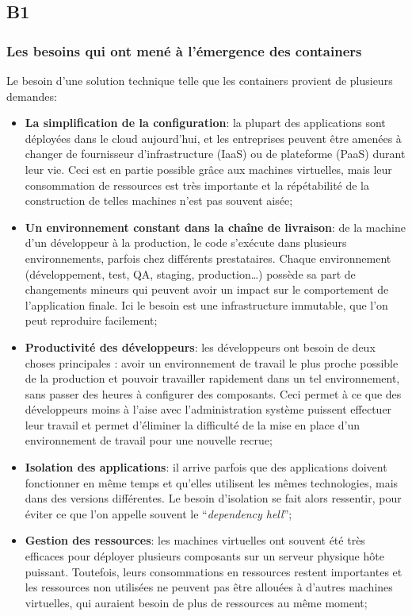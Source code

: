 \subsection*{B1}
    \subsubsection*{Les besoins qui ont mené à l'émergence des containers}
        Le besoin d'une solution technique telle que les containers provient de plusieurs demandes:
        \begin{itemize}
            \item \textbf{La simplification de la configuration}: la plupart des applications sont déployées dans le cloud aujourd'hui, et les entreprises peuvent être amenées à changer de fournisseur d'infrastructure (IaaS) ou de plateforme (PaaS) durant leur vie. Ceci est en partie possible grâce aux machines virtuelles, mais leur consommation de ressources est très importante et la répétabilité de la construction de telles machines n'est pas souvent aisée;
            \item \textbf{Un environnement constant dans la chaîne de livraison}: de la machine d'un développeur à la production, le code s'exécute dans plusieurs environnements, parfois chez différents prestataires. Chaque environnement (développement, test, QA, staging, production\dots) possède sa part de changements mineurs qui peuvent avoir un impact sur le comportement de l'application finale. Ici le besoin est une infrastructure immutable, que l'on peut reproduire facilement;
            \item \textbf{Productivité des développeurs}: les développeurs ont besoin de deux choses principales : avoir un environnement de travail le plus proche possible de la production et pouvoir travailler rapidement dans un tel environnement, sans passer des heures à configurer des composants. Ceci permet à ce que des développeurs moins à l'aise avec l'administration système puissent effectuer leur travail et permet d'éliminer la difficulté de la mise en place d'un environnement de travail pour une nouvelle recrue;
            \item \textbf{Isolation des applications}: il arrive parfois que des applications doivent fonctionner en même temps et qu'elles utilisent les mêmes technologies, mais dans des versions différentes. Le besoin d'isolation se fait alors ressentir, pour éviter ce que l'on appelle souvent le \enquote{\textit{dependency hell}};
            \item \textbf{Gestion des ressources}: les machines virtuelles ont souvent été très efficaces pour déployer plusieurs composants sur un serveur physique hôte puissant. Toutefois, leurs consommations en ressources restent importantes et les ressources non utilisées ne peuvent pas être allouées à d'autres machines virtuelles, qui auraient besoin de plus de ressources au même moment;

\end{itemize}
